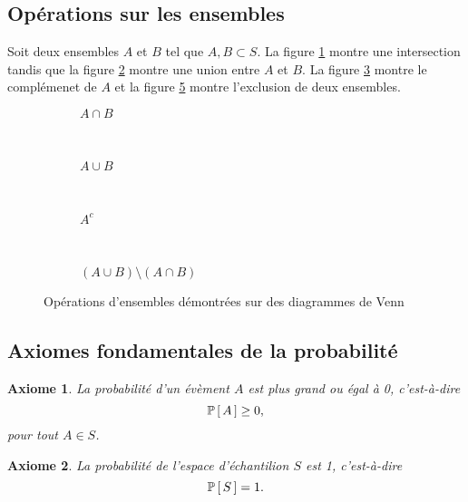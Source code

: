 \documentclass[11pt]{article}
\renewcommand\P[1]{%
	\ensuremath{%
		\mathbb{P}\left[\,#1\,\right]%
	}%
}%
\newtheorem{axiome}{Axiome}
\begin{document}
\subsection{Opérations sur les ensembles}
Soit deux ensembles $A$ et $B$ tel que $A,B\subset S$. La figure
\ref{fig:venn_intersection} montre une intersection tandis que la figure
\ref{fig:venn_union} montre une union entre $A$ et $B$. La figure
\ref{fig:venn_complement} montre le complémenet de $A$ et la figure
\ref{fig:venn_exclusion} montre l'exclusion de deux ensembles.

\begin{figure}[H]
	\centering
	\begin{subfigure}[H]{0.21\textwidth}
		\centering
		
		\caption{$A\cap B$}
		\label{fig:venn_intersection}
	\end{subfigure}
	~
	\begin{subfigure}[H]{0.21\textwidth}
		\centering
		
		\caption{$A\cup B$}
		\label{fig:venn_union}
	\end{subfigure}
	~
	\begin{subfigure}[H]{0.21\textwidth}
		\centering
		
		\caption{$A^c$}
		\label{fig:venn_complement}
	\end{subfigure}
	~
	\begin{subfigure}[H]{0.21\textwidth}
		\centering
		
		\caption{$\left(A\cup B\right)\setminus\left(A\cap B\right)$}
		\label{fig:venn_exclusion}
	\end{subfigure}
	\caption{Opérations d'ensembles démontrées sur des diagrammes de Venn}
\end{figure}

\subsection{Axiomes fondamentales de la probabilité}
\begin{axiome}
	La probabilité d'un évèment $A$ est plus grand ou égal à 0, c'est-à-dire
	\begin{equation*}
		\P{A}\geq 0,
	\end{equation*}
	pour tout $A\in S$.
\end{axiome}

\begin{axiome}
	La probabilité de l'espace d'échantilion $S$ est 1, c'est-à-dire
	\begin{equation*}
		\P{S}=1.
	\end{equation*}
\end{axiome}
\end{document}
